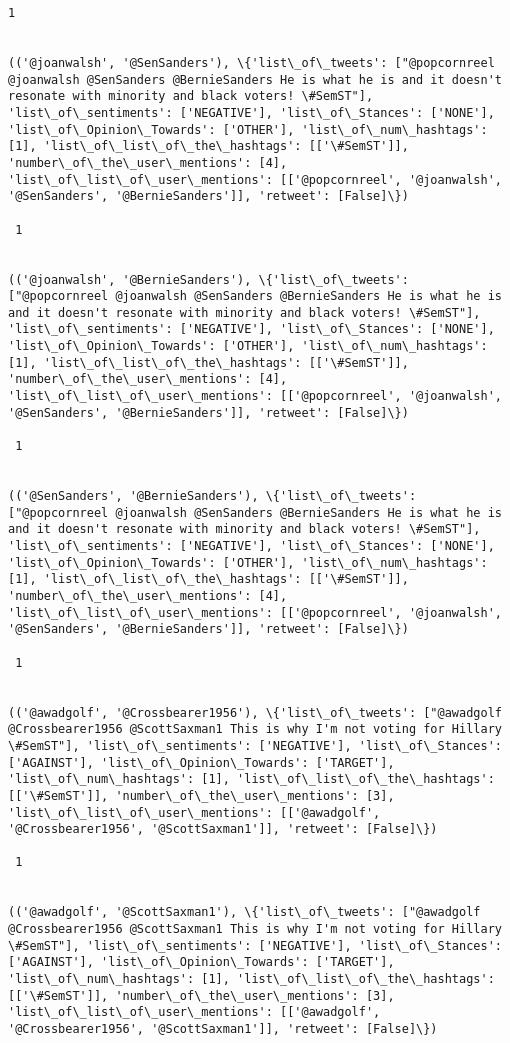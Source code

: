 \documentclass[11pt]{article}
\begin{document}
\begin{Verbatim}[commandchars=\\\{\}]
 1
 

(('@joanwalsh', '@SenSanders'), \{'list\_of\_tweets': ["@popcornreel @joanwalsh @SenSanders @BernieSanders He is what he is and it doesn't resonate with minority and black voters! \#SemST"], 'list\_of\_sentiments': ['NEGATIVE'], 'list\_of\_Stances': ['NONE'], 'list\_of\_Opinion\_Towards': ['OTHER'], 'list\_of\_num\_hashtags': [1], 'list\_of\_list\_of\_the\_hashtags': [['\#SemST']], 'number\_of\_the\_user\_mentions': [4], 'list\_of\_list\_of\_user\_mentions': [['@popcornreel', '@joanwalsh', '@SenSanders', '@BernieSanders']], 'retweet': [False]\})

 1
 

(('@joanwalsh', '@BernieSanders'), \{'list\_of\_tweets': ["@popcornreel @joanwalsh @SenSanders @BernieSanders He is what he is and it doesn't resonate with minority and black voters! \#SemST"], 'list\_of\_sentiments': ['NEGATIVE'], 'list\_of\_Stances': ['NONE'], 'list\_of\_Opinion\_Towards': ['OTHER'], 'list\_of\_num\_hashtags': [1], 'list\_of\_list\_of\_the\_hashtags': [['\#SemST']], 'number\_of\_the\_user\_mentions': [4], 'list\_of\_list\_of\_user\_mentions': [['@popcornreel', '@joanwalsh', '@SenSanders', '@BernieSanders']], 'retweet': [False]\})

 1
 

(('@SenSanders', '@BernieSanders'), \{'list\_of\_tweets': ["@popcornreel @joanwalsh @SenSanders @BernieSanders He is what he is and it doesn't resonate with minority and black voters! \#SemST"], 'list\_of\_sentiments': ['NEGATIVE'], 'list\_of\_Stances': ['NONE'], 'list\_of\_Opinion\_Towards': ['OTHER'], 'list\_of\_num\_hashtags': [1], 'list\_of\_list\_of\_the\_hashtags': [['\#SemST']], 'number\_of\_the\_user\_mentions': [4], 'list\_of\_list\_of\_user\_mentions': [['@popcornreel', '@joanwalsh', '@SenSanders', '@BernieSanders']], 'retweet': [False]\})

 1
 

(('@awadgolf', '@Crossbearer1956'), \{'list\_of\_tweets': ["@awadgolf @Crossbearer1956 @ScottSaxman1 This is why I'm not voting for Hillary \#SemST"], 'list\_of\_sentiments': ['NEGATIVE'], 'list\_of\_Stances': ['AGAINST'], 'list\_of\_Opinion\_Towards': ['TARGET'], 'list\_of\_num\_hashtags': [1], 'list\_of\_list\_of\_the\_hashtags': [['\#SemST']], 'number\_of\_the\_user\_mentions': [3], 'list\_of\_list\_of\_user\_mentions': [['@awadgolf', '@Crossbearer1956', '@ScottSaxman1']], 'retweet': [False]\})

 1
 

(('@awadgolf', '@ScottSaxman1'), \{'list\_of\_tweets': ["@awadgolf @Crossbearer1956 @ScottSaxman1 This is why I'm not voting for Hillary \#SemST"], 'list\_of\_sentiments': ['NEGATIVE'], 'list\_of\_Stances': ['AGAINST'], 'list\_of\_Opinion\_Towards': ['TARGET'], 'list\_of\_num\_hashtags': [1], 'list\_of\_list\_of\_the\_hashtags': [['\#SemST']], 'number\_of\_the\_user\_mentions': [3], 'list\_of\_list\_of\_user\_mentions': [['@awadgolf', '@Crossbearer1956', '@ScottSaxman1']], 'retweet': [False]\})


\end{Verbatim}
\end{document}
